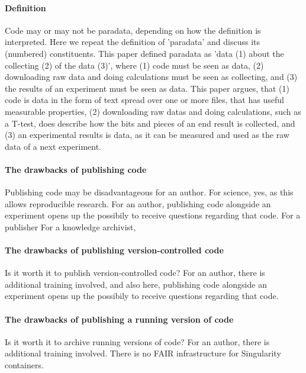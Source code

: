 \paragraph{Definition}

Code may or may not be paradata, depending on how the definition
is interpreted.
Here we repeat the definition of 'paradata' and discuss 
its (numbered) constituents.
This paper defined paradata as 'data (1) about the collecting (2) of the data (3)',
where (1) code must be seen as data, (2) downloading raw data
and doing calculations must be seen as collecting, and (3) the
results of an experiment must be seen as data.
This paper argues, that (1) code is data in the form of text spread
over one or more files, that has useful measurable properties, 
(2) downloading raw datas and doing calculations, such as a T-test,
does describe how the bits and pieces of an end result is collected,
and (3) an experimental results is data, as it can be measured and
used as the raw data of a next experiment.

\paragraph{The drawbacks of publishing code}

Publishing code may be disadvantageous for an author.
For science, yes, as this allows reproducible research.
For an author, publishing code alongside an experiment opens up
the possibily to receive questions regarding that code.
For a publisher
For a knowledge archivist, 

\paragraph{The drawbacks of publishing version-controlled code}

Is it worth it to publish version-controlled code?
For an author, 
there is additional training involved, and also here,
publishing code alongside an experiment opens up
the possibily to receive questions regarding that code.

\paragraph{The drawbacks of publishing a running version of code}

Is it worth it to archive running versions of code?
For an author, 
there is additional training involved.
There is no FAIR infrastructure for Singularity containers.

